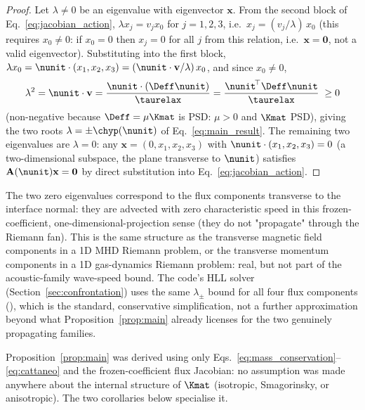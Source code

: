 \begin{proof}
Let $\lambda\neq0$ be an eigenvalue with eigenvector $\mathbf x$. From the
second block of Eq.~\eqref{eq:jacobian_action}, $\lambda x_j = v_j x_0$ for
$j=1,2,3$, i.e.\ $x_j = (v_j/\lambda)\,x_0$ (this requires $x_0\neq0$: if
$x_0=0$ then $x_j=0$ for all $j$ from this relation, i.e.\ $\mathbf
x=\mathbf 0$, not a valid eigenvector). Substituting into the first block,
$\lambda x_0 = \nunit\cdot(x_1,x_2,x_3) = (\nunit\cdot\mathbf v/\lambda)\,x_0$,
and since $x_0\neq0$,
\begin{equation}
  \lambda^2 = \nunit\cdot\mathbf v = \frac{\nunit\cdot(\Deff\nunit)}{\taurelax} = \frac{\nunit^{\!\top}\Deff\nunit}{\taurelax} \; \geq 0
\end{equation}
(non-negative because $\Deff=\mu\Kmat$ is PSD: $\mu>0$ and $\Kmat$ PSD),
giving the two roots
$\lambda=\pm\chyp(\nunit)$ of Eq.~\eqref{eq:main_result}. The remaining two
eigenvalues are $\lambda=0$: any $\mathbf x=(0,x_1,x_2,x_3)$ with
$\nunit\cdot(x_1,x_2,x_3)=0$ (a two-dimensional subspace, the plane
transverse to $\nunit$) satisfies $\mathbf A(\nunit)\mathbf x=\mathbf 0$
by direct substitution into Eq.~\eqref{eq:jacobian_action}.
\end{proof}

\begin{remark}
The two zero eigenvalues correspond to the flux components transverse to
the interface normal: they are advected with zero characteristic speed in
this frozen-coefficient, one-dimensional-projection sense (they do not
"propagate" through the Riemann fan). This is the same structure as the
transverse magnetic field components in a 1D MHD Riemann problem, or the
transverse momentum components in a 1D gas-dynamics Riemann problem: real,
but not part of the acoustic-family wave-speed bound. The code's HLL
solver (Section~\ref{sec:confrontation}) uses the same $\lambda_\pm$ bound
for all four flux components (),
which is the standard, conservative simplification, not a further
approximation beyond what Proposition~\ref{prop:main} already licenses for
the two genuinely propagating families.
\end{remark}

Proposition~\ref{prop:main} was derived using only
Eqs.~\eqref{eq:mass_conservation}--\eqref{eq:cattaneo} and the
frozen-coefficient flux Jacobian: no assumption was made anywhere about
the internal structure of $\Kmat$ (isotropic, Smagorinsky, or
anisotropic). The two corollaries below specialise it.


